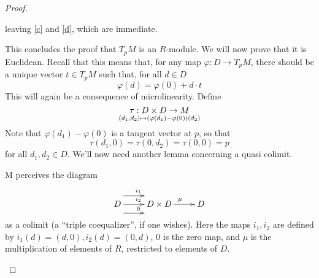 \begin{proof}
\begin{enumerate}
      leaving \ref{c} and \ref{d}, which are immediate.
  \end{enumerate}
  This concludes the proof that \( T_pM \) is an \( R \)-module. We will now prove that it is Euclidean. Recall that this means that, for any map \( \varphi:D\to T_pM \), there should be a unique vector \( t\in T_pM \) such that, for all \( d\in D \)
  \begin{equation*}
    \varphi(d) = \varphi(0) + d\cdot t
  \end{equation*}
  This will again be a consequence of microlinearity. Define
  \begin{equation*}
    \tau : D\times D\to M \atop (d_1,d_2)\mapsto (\varphi(d_1)-\varphi(0))(d_2)
  \end{equation*}
  Note that \( \varphi(d_1)-\varphi(0) \) is a tangent vector at \( p \), so that
  \begin{equation*}
    \tau(d_1,0) = \tau(0,d_2) = \tau(0,0) = p
  \end{equation*}
  for all \( d_1,d_2\in D \). We'll now need another lemma concerning a quasi colimit.

  \begin{lemma}
    M perceives the diagram
    \begin{equation}
      \xymatrix{
	D \ar@<1em>[r]^{i_1} \ar[r]^{i_2} \ar@<-1em>[r]^{0} & D\times D \ar[r]^{\mu} & D
      }
      \label{dg:3coequ}
    \end{equation}
    \label{lm:3coequ}
    as a colimit (a ``triple coequalizer'', if one wishes). Here the maps \( i_1,i_2 \) are defined by \( i_1(d)=(d,0), i_2(d)=(0,d) \), \( 0 \) is the zero map, and \( \mu \) is the multiplication of elements of \( R \), restricted to elements of \( D \).
  \end{lemma}


\end{proof}
